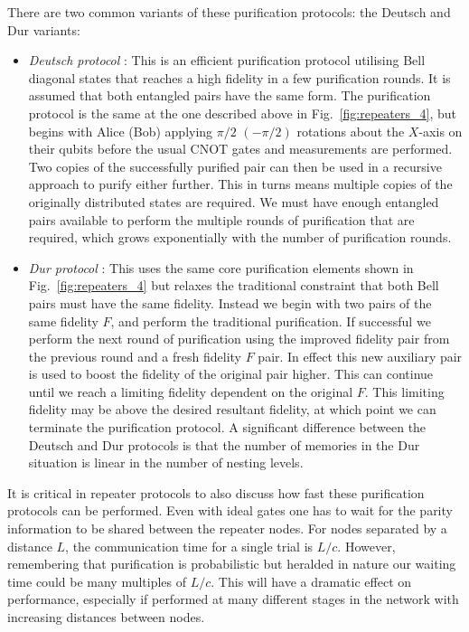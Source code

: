 \documentclass[twocolumn, aps, rmp, amsmath, amssymb, nofootinbib, superscriptaddress, longbibliography, floatfix, table-of-contents, eqsecnum]{revtex4-1}
\begin{document}
There are two common variants of these purification protocols: the Deutsch and Dur variants:
\begin{itemize}
\item \textit{Deutsch protocol} \cite{bib:Deutsch98}: This is an efficient purification protocol utilising Bell diagonal states that reaches a high fidelity in a few purification rounds. It is assumed that both entangled pairs have the same form. The purification protocol is the same at the one described above in Fig.~\ref{fig:repeaters_4}, but begins with Alice (Bob) applying $\pi/2$ $(-\pi/2)$ rotations about the $X$-axis on their qubits before the usual CNOT gates and measurements are performed. Two copies of the successfully purified pair can then be used in a recursive approach to purify either further. This in turns means multiple copies of the originally distributed states are required. We must have enough entangled pairs available to perform the multiple rounds of purification that are required, which grows exponentially with the number of purification rounds. 

\item \textit{Dur protocol} \cite{bib:dur98}: This uses the same core purification elements shown in Fig.~\ref{fig:repeaters_4} but relaxes the traditional constraint that both Bell pairs must have the same fidelity. Instead we begin with two pairs of the same fidelity $F$, and perform the traditional purification. If successful we perform the next round of purification using the improved fidelity pair from the previous round and a fresh fidelity $F$ pair. In effect this new auxiliary pair is used to boost the fidelity of the original pair higher. This can continue until we reach a limiting fidelity dependent on the original $F$. This limiting fidelity may be above the desired resultant fidelity, at which point we can terminate the purification protocol. A significant difference between the Deutsch and Dur protocols is that the number of memories in the Dur situation is linear in the number of nesting levels.
\end{itemize}

It is critical in repeater protocols to also discuss how fast these purification protocols can be performed. Even with ideal gates one has to wait for the parity information to be shared between the repeater nodes. For nodes separated by a distance $L$, the communication time for a single trial is $L/c$. However, remembering that purification is probabilistic but heralded in nature our waiting time could be many multiples of $L/c$. This will have a dramatic effect on performance, especially if performed at many different stages in the network with increasing distances between nodes.
\end{document}
